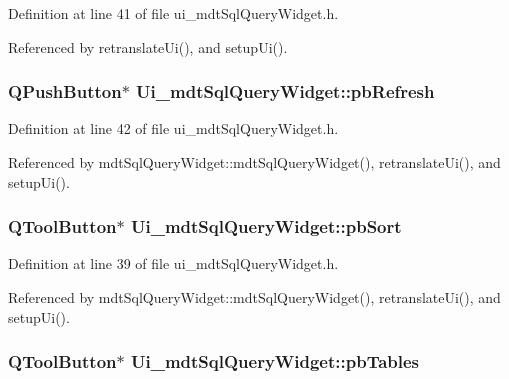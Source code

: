 Definition at line 41 of file ui\-\_\-mdt\-Sql\-Query\-Widget.\-h.



Referenced by retranslate\-Ui(), and setup\-Ui().

\hypertarget{class_ui__mdt_sql_query_widget_a117cc61c4f8ab6342e54479353cf333b}{
\subsubsection[{pb\-Refresh}]{\setlength{\rightskip}{0pt plus 5cm}Q\-Push\-Button$\ast$ Ui\-\_\-mdt\-Sql\-Query\-Widget\-::pb\-Refresh}}\label{class_ui__mdt_sql_query_widget_a117cc61c4f8ab6342e54479353cf333b}


Definition at line 42 of file ui\-\_\-mdt\-Sql\-Query\-Widget.\-h.



Referenced by mdt\-Sql\-Query\-Widget\-::mdt\-Sql\-Query\-Widget(), retranslate\-Ui(), and setup\-Ui().

\hypertarget{class_ui__mdt_sql_query_widget_aae8e5865d63a67f4377058ba0af523e9}{
\subsubsection[{pb\-Sort}]{\setlength{\rightskip}{0pt plus 5cm}Q\-Tool\-Button$\ast$ Ui\-\_\-mdt\-Sql\-Query\-Widget\-::pb\-Sort}}\label{class_ui__mdt_sql_query_widget_aae8e5865d63a67f4377058ba0af523e9}


Definition at line 39 of file ui\-\_\-mdt\-Sql\-Query\-Widget.\-h.



Referenced by mdt\-Sql\-Query\-Widget\-::mdt\-Sql\-Query\-Widget(), retranslate\-Ui(), and setup\-Ui().

\hypertarget{class_ui__mdt_sql_query_widget_a6a5136ed52cadc20027117ee6cba892e}{
\subsubsection[{pb\-Tables}]{\setlength{\rightskip}{0pt plus 5cm}Q\-Tool\-Button$\ast$ Ui\-\_\-mdt\-Sql\-Query\-Widget\-::pb\-Tables}}\label{class_ui__mdt_sql_query_widget_a6a5136ed52cadc20027117ee6cba892e}


